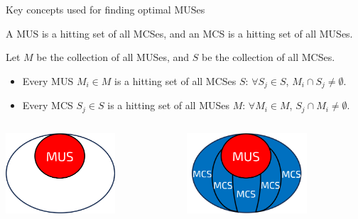 \documentclass{cons-beamer}
\begin{document}
\begin{frame}{Key concepts used for finding optimal MUSes}

  \begin{definition}
    A MUS is a hitting set of all MCSes, and an MCS is a hitting set of all MUSes. 

    Let $M$ be the collection of all MUSes, and $S$ be the collection of all MCSes.
    \begin{itemize}
      \item Every MUS $M_i \in M$ is a hitting set of all MCSes $S$: $\forall S_j \in S$, $M_i \cap S_j \neq \emptyset$.
      \item Every MCS $S_j \in S$ is a hitting set of all MUSes $M$: $\forall M_i \in M$, $S_j \cap M_i \neq \emptyset$.
    \end{itemize}
  \end{definition}

  \vfill
  \begin{columns}

    \begin{column}{0.5\textwidth}        
      \begin{center}
        \includegraphics[height=30mm]{images/texpl_img/mus.png}
      \end{center}
    \end{column}

    \begin{column}{0.5\textwidth}        
      \begin{center}
        \includegraphics[height=30mm]{images/texpl_img/hittingset.png}
      \end{center}
    \end{column}
  \end{columns}
\end{frame}
\end{document}
